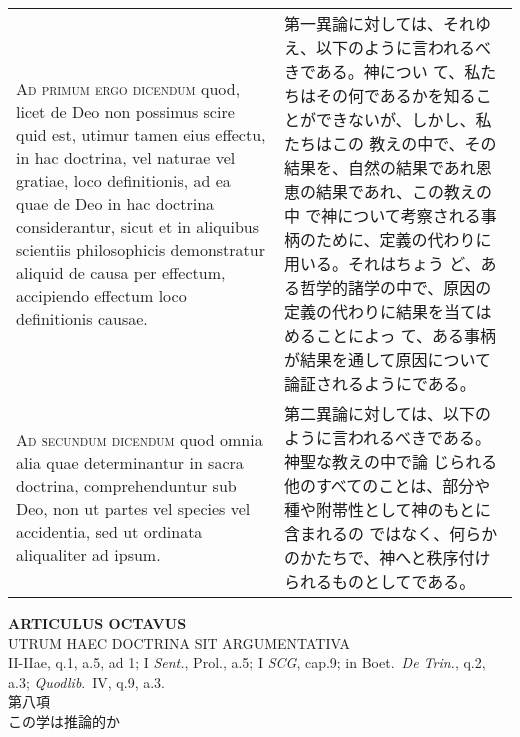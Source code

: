 \documentclass[10pt]{jsarticle}
\begin{document}
\begin{longtable}{p{21em}p{21em}}
\\


{\scshape Ad primum ergo dicendum} quod, licet de Deo non possimus
scire quid est, utimur tamen eius effectu, in hac doctrina, vel
naturae vel gratiae, loco definitionis, ad ea quae de Deo in hac
doctrina considerantur, sicut et in aliquibus scientiis philosophicis
demonstratur aliquid de causa per effectum, accipiendo effectum loco
definitionis causae.


&

第一異論に対しては、それゆえ、以下のように言われるべきである。神につい
て、私たちはその何であるかを知ることができないが、しかし、私たちはこの
教えの中で、その結果を、自然の結果であれ恩恵の結果であれ、この教えの中
で神について考察される事柄のために、定義の代わりに用いる。それはちょう
ど、ある哲学的諸学の中で、原因の定義の代わりに結果を当てはめることによっ
て、ある事柄が結果を通して原因について論証されるようにである。


\\


{\scshape Ad secundum dicendum} quod omnia alia quae determinantur in
sacra doctrina, comprehenduntur sub Deo, non ut partes vel species vel
accidentia, sed ut ordinata aliqualiter ad ipsum.


&

第二異論に対しては、以下のように言われるべきである。神聖な教えの中で論
じられる他のすべてのことは、部分や種や附帯性として神のもとに含まれるの
ではなく、何らかのかたちで、神へと秩序付けられるものとしてである。


\end{longtable}
\newpage


\begin{center}
 {\Large {\bf ARTICULUS OCTAVUS}}\\
 {\large UTRUM HAEC DOCTRINA SIT ARGUMENTATIVA}\\
 {\footnotesize II-IIae, q.1, a.5, ad 1; I {\itshape Sent.}, Prol., a.5;
 I {\itshape SCG}, cap.9; in Boet.~{\itshape De Trin.}, q.2, a.3;
 {\itshape Quodlib}.~IV, q.9, a.3.}\\
 {\Large 第八項\\この学は推論的か}
\end{center}
\end{document}
